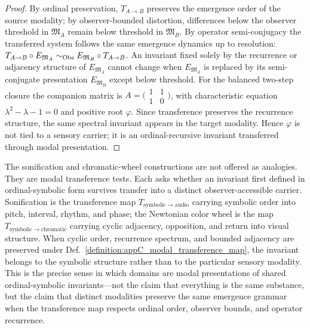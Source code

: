 \begin{proof}
\label{proof:appC_modal_transference}
By ordinal preservation, $T_{A\to B}$ preserves the emergence order of the source
modality; by observer-bounded distortion, differences below the observer
threshold in $\mathfrak{M}_A$ remain below threshold in $\mathfrak{M}_B$. By
operator semi-conjugacy the transferred system follows the same emergence
dynamics up to resolution: $T_{A\to B}\circ E_{\mathfrak{M}_A} \sim_{\mathrm{Obs}}
E_{\mathfrak{M}_B}\circ T_{A\to B}$. An invariant fixed solely by the recurrence
or adjacency structure of $E_{\mathfrak{M}_A}$ cannot change when $E_{\mathfrak{M}_A}$
is replaced by its semi-conjugate presentation $E_{\mathfrak{M}_B}$ except below
threshold. For the balanced two-step closure the companion matrix is
$A=\big(\begin{smallmatrix}1&1\\1&0\end{smallmatrix}\big)$, with characteristic
equation $\lambda^2-\lambda-1=0$ and positive root $\varphi$. Since transference
preserves the recurrence structure, the same spectral invariant appears in the
target modality. Hence $\varphi$ is not tied to a sensory carrier; it is an
ordinal-recursive invariant transferred through modal presentation.
\end{proof}

\begin{scholium}
\label{scholium:appC_transference_tests}
The sonification and chromatic-wheel constructions are not offered as analogies.
They are modal transference tests. Each asks whether an invariant first defined
in ordinal-symbolic form survives transfer into a distinct observer-accessible
carrier. Sonification is the transference map
$T_{\mathrm{symbolic}\to\mathrm{audio}}$ carrying symbolic order into pitch,
interval, rhythm, and phase; the Newtonian color wheel is the map
$T_{\mathrm{symbolic}\to\mathrm{chromatic}}$ carrying cyclic adjacency,
opposition, and return into visual structure. When cyclic order, recurrence
spectrum, and bounded adjacency are preserved under
Def.~\ref{definition:appC_modal_transference_map}, the invariant belongs to the
symbolic structure rather than to the particular sensory modality. This is the
precise sense in which domains are modal presentations of shared ordinal-symbolic
invariants---not the claim that everything is the same substance, but the claim
that distinct modalities preserve the same emergence grammar when the
transference map respects ordinal order, observer bounds, and operator recurrence.
\end{scholium}
